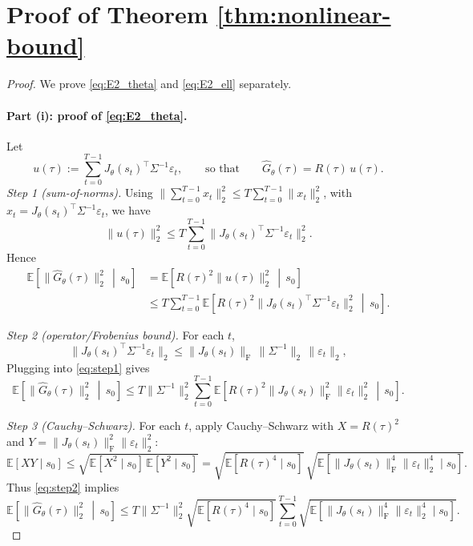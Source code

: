 \section{Proof of Theorem \ref{thm:nonlinear-bound} }
\label{sec:app-proof-nonlinear-upperbound}

\begin{proof}
We prove \eqref{eq:E2_theta} and \eqref{eq:E2_ell} separately.

\paragraph{Part (i): proof of \eqref{eq:E2_theta}.}
Let
\[
u(\tau):=\sum_{t=0}^{T-1} J_\theta(s_t)^\top \Sigma^{-1}\varepsilon_t,
\qquad\text{so that}\qquad
\widehat G_\theta(\tau)=R(\tau)\,u(\tau).
\]
\emph{Step 1 (sum-of-norms).}
Using $\big\|\sum_{t=0}^{T-1} x_t\big\|_2^2 \le T\sum_{t=0}^{T-1}\|x_t\|_2^2$,
with $x_t=J_\theta(s_t)^\top \Sigma^{-1}\varepsilon_t$, we have
\[
\|u(\tau)\|_2^2 \le T\sum_{t=0}^{T-1}\|J_\theta(s_t)^\top \Sigma^{-1}\varepsilon_t\|_2^2.
\]
Hence
\begin{align}
\mathbb E\!\left[\|\widehat G_\theta(\tau)\|_2^2 \,\middle|\, s_0\right]
&=
\mathbb E\!\left[R(\tau)^2\|u(\tau)\|_2^2 \,\middle|\, s_0\right] \nonumber\\
&\le
T\sum_{t=0}^{T-1}
\mathbb E\!\left[R(\tau)^2\|J_\theta(s_t)^\top \Sigma^{-1}\varepsilon_t\|_2^2 \,\middle|\, s_0\right].
\label{eq:step1}
\end{align}

\emph{Step 2 (operator/Frobenius bound).}
For each $t$,
\[
\|J_\theta(s_t)^\top \Sigma^{-1}\varepsilon_t\|_2
\le \|J_\theta(s_t)\|_{\mathrm{F}}\,\|\Sigma^{-1}\|_2\,\|\varepsilon_t\|_2,
\]
Plugging into \eqref{eq:step1} gives
\begin{equation}
\label{eq:step2}
\mathbb E\!\left[\|\widehat G_\theta(\tau)\|_2^2 \,\middle|\, s_0\right]
\le
T\|\Sigma^{-1}\|_2^2\sum_{t=0}^{T-1}
\mathbb E\!\left[R(\tau)^2\|J_\theta(s_t)\|_{\mathrm{F}}^2\|\varepsilon_t\|_2^2 \,\middle|\, s_0\right].
\end{equation}

\emph{Step 3 (Cauchy--Schwarz).}
For each $t$, apply Cauchy--Schwarz with
$X=R(\tau)^2$ and $Y=\|J_\theta(s_t)\|_{\mathrm{F}}^2\|\varepsilon_t\|_2^2$:
\[
\mathbb E[XY\mid s_0]\le \sqrt{\mathbb E[X^2\mid s_0]\,\mathbb E[Y^2\mid s_0]}
=
\sqrt{\mathbb E[R(\tau)^4\mid s_0]}\,
\sqrt{\mathbb E[\|J_\theta(s_t)\|_{\mathrm{F}}^4\|\varepsilon_t\|_2^4\mid s_0]}.
\]
Thus \eqref{eq:step2} implies
\begin{equation}
\label{eq:step3}
\mathbb E\!\left[\|\widehat G_\theta(\tau)\|_2^2 \,\middle|\, s_0\right]
\le
T\|\Sigma^{-1}\|_2^2\sqrt{\mathbb E[R(\tau)^4\mid s_0]}
\sum_{t=0}^{T-1}
\sqrt{\mathbb E[\|J_\theta(s_t)\|_{\mathrm{F}}^4\|\varepsilon_t\|_2^4\mid s_0]}.
\end{equation}


\end{proof}
